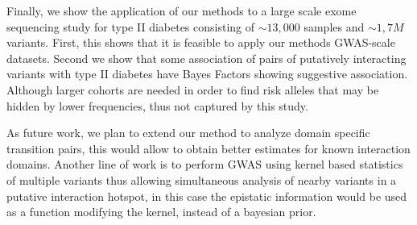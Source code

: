 Finally, we show the application of our methods to a large scale exome sequencing study for type II diabetes consisting of $\sim 13,000$ samples and $\sim 1,7M$ variants. First, this shows that it is feasible to apply our methods GWAS-scale datasets. Second we show that some association of pairs of putatively interacting variants with type II diabetes have Bayes Factors showing suggestive association. Although larger cohorts are needed in order to find risk alleles that may be hidden by lower frequencies, thus not captured by this study.

As future work, we plan to extend our method to analyze domain specific transition pairs, this would allow to obtain better estimates for known interaction domains. Another line of work is to perform GWAS using kernel based statistics of multiple variants \cite{wu2011rare} thus allowing simultaneous analysis of nearby variants in a putative interaction hotspot, in this case the epistatic information would be used as a function modifying the kernel, instead of a bayesian prior.

